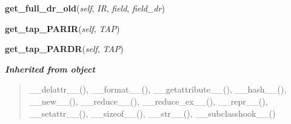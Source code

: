     \vspace{0.5ex}

\hspace{.8\funcindent}\begin{boxedminipage}{\funcwidth}

    \raggedright \textbf{get\_full\_dr\_old}(\textit{self}, \textit{IR}, \textit{field}, \textit{field\_dr})

\setlength{\parskip}{2ex}
\setlength{\parskip}{1ex}
    \end{boxedminipage}

    \label{hpl_tap_spf_api:HplTapSpfApi:get_tap_PARIR}

    \vspace{0.5ex}

\hspace{.8\funcindent}\begin{boxedminipage}{\funcwidth}

    \raggedright \textbf{get\_tap\_PARIR}(\textit{self}, \textit{TAP})

\setlength{\parskip}{2ex}
\setlength{\parskip}{1ex}
    \end{boxedminipage}

    \label{hpl_tap_spf_api:HplTapSpfApi:get_tap_PARDR}

    \vspace{0.5ex}

\hspace{.8\funcindent}\begin{boxedminipage}{\funcwidth}

    \raggedright \textbf{get\_tap\_PARDR}(\textit{self}, \textit{TAP})

\setlength{\parskip}{2ex}
\setlength{\parskip}{1ex}
    \end{boxedminipage}


\large{\textbf{\textit{Inherited from object}}}

\begin{quote}
\_\_delattr\_\_(), \_\_format\_\_(), \_\_getattribute\_\_(), \_\_hash\_\_(), \_\_new\_\_(), \_\_reduce\_\_(), \_\_reduce\_ex\_\_(), \_\_repr\_\_(), \_\_setattr\_\_(), \_\_sizeof\_\_(), \_\_str\_\_(), \_\_subclasshook\_\_()
\end{quote}

